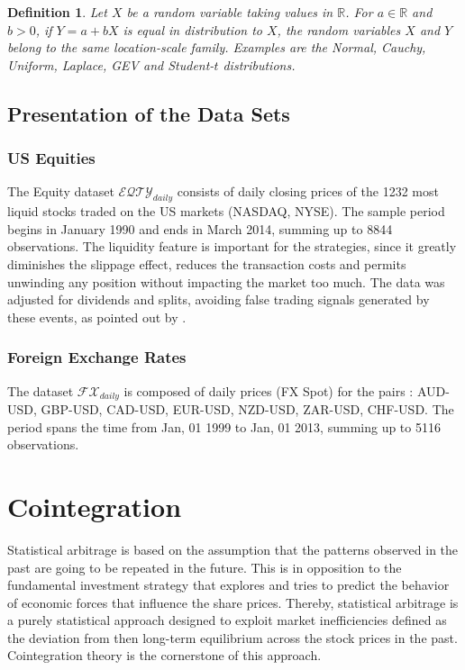 \documentclass[11pt,a4,twosided,singlespacing,titlepagenumber=on]{scrreprt}
\numberwithin{equation}{chapter} %
\newtheorem{definition}[theorem]{Definition}%
\theoremstyle{remark}
\begin{document}
\begin{definition}
\label{location_scale_family}
Let $X$ be a random variable taking values in $\mathbb{R}$. For $a \in \mathbb{R}$ and $b > 0$, if $Y = a + b X$ is equal in distribution to $X$, the random variables $X$ and $Y$ belong to the same location-scale family. Examples are the Normal, Cauchy, Uniform, Laplace, GEV and Student-$t$ distributions.
\end{definition}

\section{Presentation of the Data Sets}
\subsection{US Equities}
\label{sec:presentation_data}
The Equity dataset $\mathcal{EQTY}_{daily}$ consists of daily closing prices of the 1232 most liquid stocks traded on the US markets (NASDAQ, NYSE). The sample period begins in January 1990 and ends in March 2014, summing up to 8844 observations. The liquidity feature is important for the strategies, since it greatly diminishes the slippage effect, reduces the transaction costs and permits unwinding any position without impacting the market too much. The data was adjusted for dividends and splits, avoiding false trading signals generated by these events, as pointed out by \cite{broussard2012}.

\subsection{Foreign Exchange Rates}
The dataset $\mathcal{FX}_{daily}$ is composed of daily prices (FX Spot) for the pairs : AUD-USD, GBP-USD, CAD-USD, EUR-USD, NZD-USD, ZAR-USD, CHF-USD. The period spans the time from Jan, 01 1999 to Jan, 01 2013, summing up to 5116 observations.

\chapter{Cointegration}

Statistical arbitrage is based on the assumption that the patterns observed in the past are going to be repeated in the future. This is in opposition to the fundamental investment strategy that explores and tries to predict the behavior of economic forces that influence the share prices. Thereby, statistical arbitrage is a purely statistical approach designed to exploit market inefficiencies defined as the deviation from then long-term equilibrium across the stock prices in the past. Cointegration theory is the cornerstone of this approach. 
\end{document}
